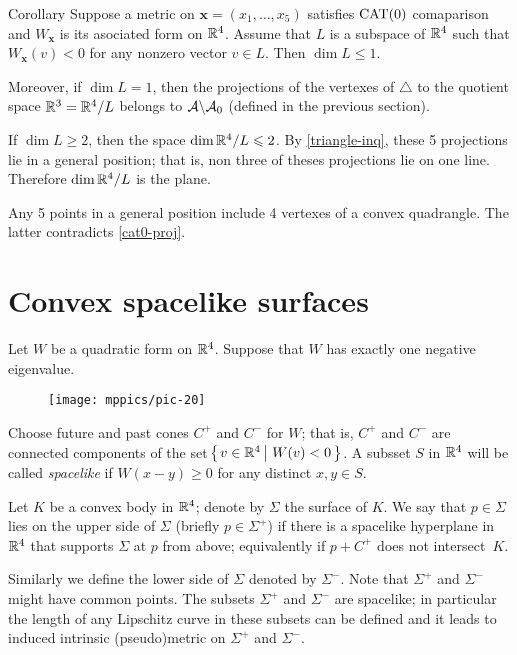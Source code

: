 \documentclass{article}
\begin{document}
\begin{thm}{Corollary}\label{cor:3+2}
Suppose a metric on $\bm{x}=(x_1,\dots,x_5)$ satisfies $\mathrm{CAT}(0)$ comaparison
and $W_{\bm{x}}$ is its asociated form on $\mathbb{R}^{4}$.
Assume that $L$ is a subspace of $\mathbb{R}^{4}$ such that
$W_{\bm{x}}(v)< 0$ for any nonzero vector $v\in L$.
Then $\dim L\le 1$.

Moreover, if $\dim L= 1$, then the projections of the vertexes of $\triangle$ to the quotient space $\mathbb{R}^3=\mathbb{R}^4/L$ belongs to $\mathcal{A}\backslash\mathcal{A}_0$ (defined in the previous section). 
\end{thm}

If $\dim L\ge 2$, then the space $\mathop{\rm dim}\nolimits \mathbb{R}^4/L\leqslant 2$.
By \ref{triangle-inq}, these 5 projections lie in a general position; that is, non three of theses projections lie on one line. 
Therefore $\mathop{\rm dim}\nolimits \mathbb{R}^4/L$ is the plane.

Any 5 points in a general position include 4 vertexes of a convex quadrangle.
The latter contradicts \ref{cat0-proj}.
\qeds

\section{Convex spacelike surfaces}

Let $W$ be a quadratic form on $\mathbb{R}^4$.
Suppose that  $W$ has exactly one negative eigenvalue.

{

\begin{wrapfigure}{r}{55mm}
\vskip-6mm
\centering
\texttt{[image: mppics/pic-20]}
\end{wrapfigure}

Choose future and past cones $C^+$ and $C^-$ for $W$;
that is, $C^+$ and $C^-$ are connected components of the set
$\set{v\in\RR^4}{W(v)< 0}$.
A subsset $S$ in $\mathbb{R}^4$ will be called \emph{spacelike} if $W(x-y)\ge 0$ for any distinct $x,y\in S$.

}

Let $K$ be a convex body in $\mathbb{R}^4$;
denote by $\Sigma$ the surface of $K$. 
We say that $p\in \Sigma$ lies on the upper side of $\Sigma$ (briefly $p\in\Sigma^+$) if there is a spacelike hyperplane in $\mathbb{R}^4$ that supports $\Sigma$ at $p$ from above;
equivalently if $p+C^+$ does not intersect~$K$.

Similarly we define the lower side of $\Sigma$ denoted by $\Sigma^-$.
Note that $\Sigma^+$ and $\Sigma^-$ might have common points.
The subsets $\Sigma^+$ and $\Sigma^-$ are spacelike;
in particular the length of any Lipschitz curve in these subsets can be defined and it leads to induced intrinsic (pseudo)metric on $\Sigma^+$ and $\Sigma^-$. 
\end{document}

